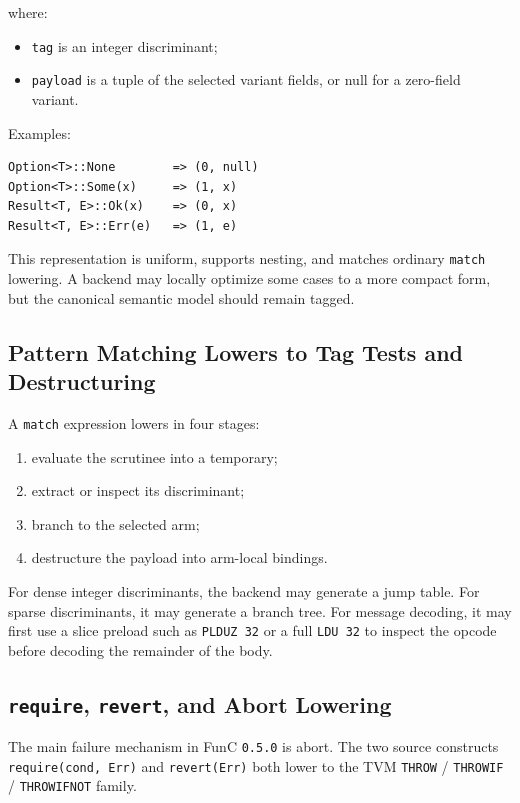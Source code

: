 \documentclass[12pt,oneside]{article}
\begin{document}
where:

\begin{itemize}
\item \verb|tag| is an integer discriminant;
\item \verb|payload| is a tuple of the selected variant fields, or null for a
zero-field variant.
\end{itemize}

Examples:

\begin{verbatim}
Option<T>::None        => (0, null)
Option<T>::Some(x)     => (1, x)
Result<T, E>::Ok(x)    => (0, x)
Result<T, E>::Err(e)   => (1, e)
\end{verbatim}

This representation is uniform, supports nesting, and matches ordinary
\verb|match| lowering. A backend may locally optimize some cases to a more
compact form, but the canonical semantic model should remain tagged.

\subsection{Pattern Matching Lowers to Tag Tests and Destructuring}
A \verb|match| expression lowers in four stages:

\begin{enumerate}
\item evaluate the scrutinee into a temporary;
\item extract or inspect its discriminant;
\item branch to the selected arm;
\item destructure the payload into arm-local bindings.
\end{enumerate}

For dense integer discriminants, the backend may generate a jump table. For
sparse discriminants, it may generate a branch tree. For message decoding, it
may first use a slice preload such as \verb|PLDUZ 32| or a full \verb|LDU 32|
to inspect the opcode before decoding the remainder of the body.

\subsection{\texttt{require}, \texttt{revert}, and Abort Lowering}
\label{sec:lower-require}
The main failure mechanism in FunC \verb|0.5.0| is abort. The two
source constructs \verb|require(cond, Err)| and \verb|revert(Err)|
both lower to the TVM
\verb|THROW| / \verb|THROWIF| / \verb|THROWIFNOT| family.
\end{document}
